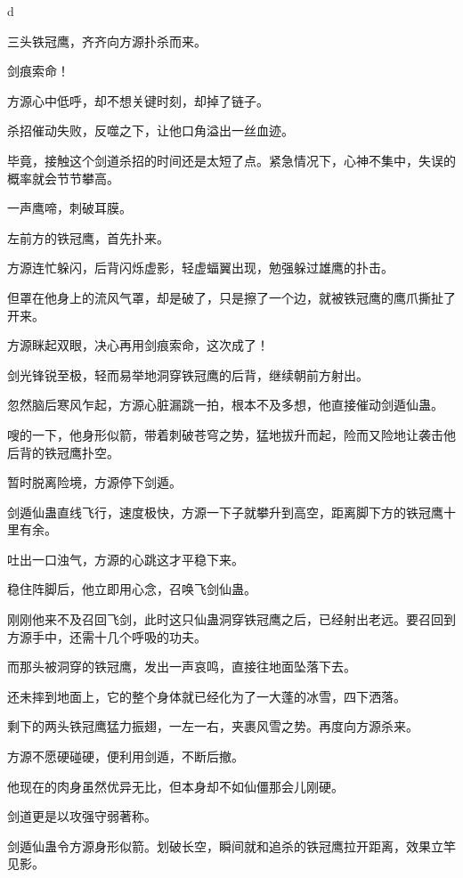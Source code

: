 
\begin{this_body}

d

三头铁冠鹰，齐齐向方源扑杀而来。

剑痕索命！

方源心中低呼，却不想关键时刻，却掉了链子。

杀招催动失败，反噬之下，让他口角溢出一丝血迹。

毕竟，接触这个剑道杀招的时间还是太短了点。紧急情况下，心神不集中，失误的概率就会节节攀高。

一声鹰啼，刺破耳膜。

左前方的铁冠鹰，首先扑来。

方源连忙躲闪，后背闪烁虚影，轻虚蝠翼出现，勉强躲过雄鹰的扑击。

但罩在他身上的流风气罩，却是破了，只是擦了一个边，就被铁冠鹰的鹰爪撕扯了开来。

方源眯起双眼，决心再用剑痕索命，这次成了！

剑光锋锐至极，轻而易举地洞穿铁冠鹰的后背，继续朝前方射出。

忽然脑后寒风乍起，方源心脏漏跳一拍，根本不及多想，他直接催动剑遁仙蛊。

嗖的一下，他身形似箭，带着刺破苍穹之势，猛地拔升而起，险而又险地让袭击他后背的铁冠鹰扑空。

暂时脱离险境，方源停下剑遁。

剑遁仙蛊直线飞行，速度极快，方源一下子就攀升到高空，距离脚下方的铁冠鹰十里有余。

吐出一口浊气，方源的心跳这才平稳下来。

稳住阵脚后，他立即用心念，召唤飞剑仙蛊。

刚刚他来不及召回飞剑，此时这只仙蛊洞穿铁冠鹰之后，已经射出老远。要召回到方源手中，还需十几个呼吸的功夫。

而那头被洞穿的铁冠鹰，发出一声哀鸣，直接往地面坠落下去。

还未摔到地面上，它的整个身体就已经化为了一大蓬的冰雪，四下洒落。

剩下的两头铁冠鹰猛力振翅，一左一右，夹裹风雪之势。再度向方源杀来。

方源不愿硬碰硬，便利用剑遁，不断后撤。

他现在的肉身虽然优异无比，但本身却不如仙僵那会儿刚硬。

剑道更是以攻强守弱著称。

剑遁仙蛊令方源身形似箭。划破长空，瞬间就和追杀的铁冠鹰拉开距离，效果立竿见影。


\end{this_body}

